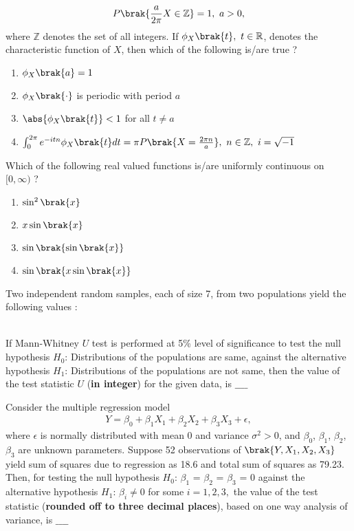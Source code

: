 \begin{align*}
    P\brak{\frac{a}{2\pi}X \in \mathbb{Z}} = 1,\ a > 0,
\end{align*}
where $\mathbb{Z}$ denotes the set of all integers. If $\phi_X\brak{t},\ t \in \mathbb{R}$, denotes the characteristic function of $X$, then which of the following is/are true ? 
\begin{enumerate}
    \item $\phi_X\brak{a} = 1$
    \item $\phi_X\brak{\cdot}$ is periodic with period $a$
    \item $\abs{\phi_X\brak{t}} < 1$ for all $t \neq a$
    \item $\int_{0}^{2\pi} e^{-itn}\phi_X\brak{t}dt = \pi P \brak{X = \frac{2 \pi n}{a}},\ n\in \mathbb{Z},\ i = \sqrt{-1}$ \\
\end{enumerate}
\item Which of the following real valued functions is/are uniformly continuous on $[0, \infty)$ ?
\begin{enumerate}
    \item $\sin^2\brak{x}$
    \item $x\sin\brak{x}$
    \item $\sin\brak{\sin\brak{x}}$
    \item $\sin\brak{x\sin\brak{x}}$ \\ 
\end{enumerate}
\item Two independent random samples, each of size 7, from two populations yield the following values : 
\begin{table}[h!]
  \centering
  
\end{table}\\
If Mann-Whitney $U$ test is performed at 5\% level of significance to test the null hypothesis $H_0$: Distributions of the populations are same, against the alternative hypothesis $H_1$: Distributions of the populations are not same, then the value of the test statistic $U$ (\textbf{in integer}) for the given data, is $\_\_\_\_$ \\
\item Consider the multiple regression model
\begin{align*}
    Y = \beta_0 + \beta_1X_1 + \beta_2X_2 +\beta_3X_3 + \epsilon,
\end{align*}
where $\epsilon$ is normally distributed with mean 0 and variance $\sigma^2 > 0$, and $\beta_0$, $\beta_1$, $\beta_2$, $\beta_3$ are unknown parameters. Suppose 52 observations of $\brak{Y, X_1, X_2, X_3}$ yield sum of squares due to regression as 18.6 and total sum of squares as 79.23. Then, for testing the null hypothesis $H_0$: $\beta_1$ = $\beta_2$ = $\beta_3$ = 0 against the alternative hypothesis $H_1$: $\beta_i \neq 0$ for some $i = 1, 2, 3,$ the value of the test statistic (\textbf{rounded off to three decimal places}), based on one way analysis of variance, is $\_\_\_\_$
